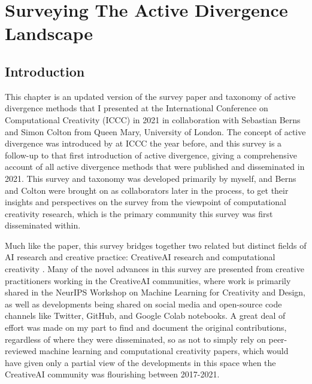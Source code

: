 \chapter{Surveying The Active Divergence Landscape}
\label{ch:active_div}

\section{Introduction}

This chapter is an updated version of the survey paper and taxonomy of active divergence methods that I presented at the International Conference on Computational Creativity (ICCC) in 2021 \citep{broad2021active} in collaboration with Sebastian Berns and Simon Colton from Queen Mary, University of London. 
The concept of active divergence was introduced by \cite{berns2020bridging} at ICCC the year before, and this survey is a follow-up to that first introduction of active divergence, giving a comprehensive account of all active divergence methods that were published and disseminated in 2021. 
This survey and taxonomy was developed primarily by myself, and Berns and Colton were brought on as collaborators later in the process, to get their insights and perspectives on the survey from the viewpoint of computational creativity research, which is the primary community this survey was first disseminated within.

Much like the \cite{berns2020bridging} paper, this survey bridges together two related but distinct fields of AI research and creative practice: CreativeAI research and computational creativity \citep{cook2018neighbouring}.
Many of the novel advances in this survey are presented from creative practitioners working in the CreativeAI communities, where work is primarily shared in the NeurIPS Workshop on Machine Learning for Creativity and Design, as well as developments being shared on social media and open-source code channels like Twitter, GitHub, and Google Colab notebooks. 
A great deal of effort was made on my part to find and document the original contributions, regardless of where they were disseminated, so as not to simply rely on peer-reviewed machine learning and computational creativity papers, which would have given only a partial view of the developments in this space when the CreativeAI community was flourishing between 2017-2021.


